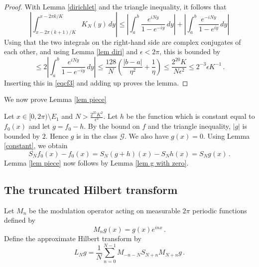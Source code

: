 {\begin{proof}
With Lemma \ref{dirichlet} and the triangle inequality,
it follows that
\begin{equation}
   \left|\int_{x-2\pi (k+1)/K}^{x-2\pi k/K} K_N(y)\, dy\right|
   \le \left|\int_{a}^{b}
   \frac{e^{iNy}}{1-e^{-iy}}\, dy\right|+
   \left|\int_{a}^{b}
   \frac{e^{-iNy}}{1-e^{iy}}\, dy\right|
\end{equation}
Using that the two integrals on the right-hand side are complex conjugates of each other, and using Lemma \ref{lem diri} and $\epsilon <2\pi$, this is bounded by
\begin{equation}
   \le 2\left|\int_{a}^{b}
   \frac{e^{iNy}}{1-e^{-iy}}\, dy\right|
   \le \frac{128}N(\frac{|b-a|}{\eta^2}+\frac 1{\eta})
   \le \frac{2^{20}K}{N\epsilon^2 }\le 2^{-3}\epsilon K^{-1}\, .
\end{equation}
Inserting this in \eqref{eqcf3} and adding up proves
the lemma.
\end{proof}

We now prove  Lemma \ref{lem piece}

Let $x\in [0,2\pi)\setminus E_1 $ and $N>\frac {2^{25} K^2}{\epsilon ^3}$.
Let $h$ be the function which is constant equal to $f_0(x)$ and let $g=f_0-h$.
By the bound on $f$ and the triangle inequality,
$|g|$ is bounded by $2$. Hence $g$ is in the class $\mathcal{G}$. We also have $g(x)=0$.
Using Lemma \ref{constant}, we obtain
\begin{equation}
    S_Nf_0(x)- f_0(x)=S_N(g+h)(x)- S_Nh(x)=S_Ng(x)\, .
\end{equation}
Lemma \ref{lem piece}
now follows by Lemma \ref{lem g with zero}.



\subsection{The truncated Hilbert transform}
\label{10hilbert}










Let $M_n$ be the modulation operator
acting on measurable $2\pi$ periodic functions
defined by
\begin{equation}
    M_ng(x)=g(x) e^{inx}\, .
\end{equation}
Define the approximate Hilbert transform by
\begin{equation}
    L_N g=\frac 1N\sum_{n=0}^{N-1}
       M_{-n-N} S_{N+n}M_{N+n}g\, .
\end{equation}


}

